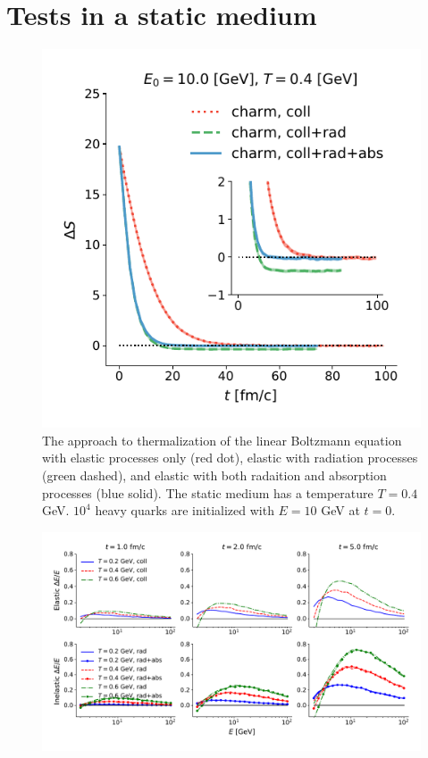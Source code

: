\documentclass[aps, prc, reprint, amsmath, groupedaddress, nofootinbib]{revtex4-1}
\begin{document}
\section{Tests in a static medium}\label{section:test}
\begin{figure}
\includegraphics[width=\columnwidth]{thermalization.pdf}
\caption{The approach to thermalization of the linear Boltzmann equation with elastic processes only (red dot), elastic with radiation processes (green dashed), and elastic with both radaition and absorption processes (blue solid). The static medium has a temperature $T = 0.4$ GeV. $10^4$ heavy quarks are initialized with $E = 10$ GeV at $t = 0$.}\label{plots:thermalization}
\end{figure}
\begin{figure}
\includegraphics[width=\textwidth]{E_Eloss.pdf}
\caption{}\label{plots:dE-E}
\end{figure}
\end{document}
